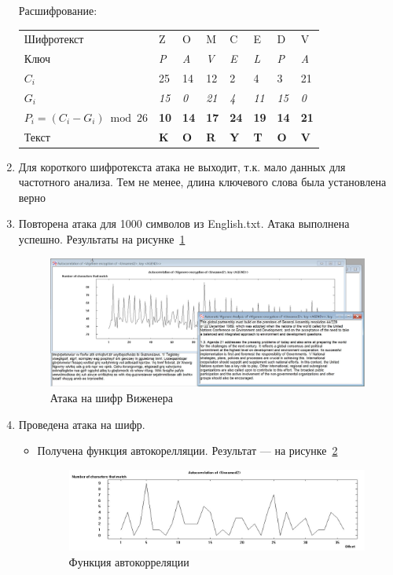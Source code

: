\documentclass[a4paper, 14pt]{extarticle}
\begin{document}
\begin{enumerate}
    \FloatBarrier{}
    Расшифрование:
    \begin{table}[h]
        \centering
        \begin{tabular}{@{}llllllll@{}}
        \toprule
        Шифротекст & Z & O & M & C & E & D & V \\
        Ключ & \textit{P} & \textit{A} & \textit{V} & \textit{E} & \textit{L} & \textit{P} & \textit{A} \\ \midrule
        $C_i$ & 25 & 14 & 12 & 2 & 4 & 3 & 21 \\
        $G_i$ & \textit{15} & \textit{0} & \textit{21} & \textit{4} & \textit{11} & \textit{15} & \textit{0} \\ \midrule
        $P_i = (C_i - G_i) \bmod 26$ & \textbf{10} & \textbf{14} & \textbf{17} & \textbf{24} & \textbf{19} & \textbf{14} & \textbf{21} \\
        Текст & \textbf{K} & \textbf{O} & \textbf{R} & \textbf{Y} & \textbf{T} & \textbf{O} & \textbf{V} \\
        \bottomrule
        \end{tabular}
    \end{table}
    \item Для короткого шифротекста атака не выходит, т.к. мало данных для частотного анализа. Тем не менее, длина ключевого слова была установлена верно
    \item Повторена атака для 1000 символов из English.txt. Атака выполнена успешно. Результаты на рисунке~\ref{img:3:2}
    \begin{figure}[h]
        \centering
        \includegraphics[width=\textwidth]{./img/S011.jpg}
        \caption{Атака на шифр Виженера}%
        \label{img:3:2}
    \end{figure}
    \item Проведена атака на шифр.
    \begin{itemize}
        \item Получена функция автокорелляции. Результат --- на рисунке~\ref{img:3:3}
        \begin{figure}[h]
            \centering
            \includegraphics[width=\textwidth]{./img/S012.jpg}
            \caption{Функция автокорреляции}%
            \label{img:3:3}
        \end{figure}
        

\end{itemize}
\end{enumerate}
\end{document}
